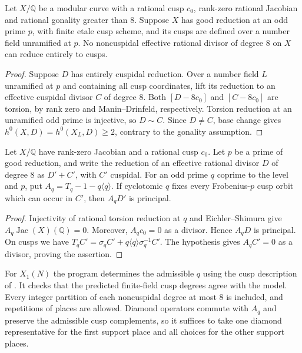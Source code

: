 \begin{lemma}\label{lem:octic-odd-cuspidal}
Let $X/\mathbb Q$ be a modular curve with a rational cusp $c_0$,
rank-zero rational Jacobian and rational gonality greater than $8$.
Suppose $X$ has good reduction at an odd prime $p$, with finite etale
cusp scheme, and its cusps are defined over a number field unramified at $p$.
No noncuspidal effective rational divisor of degree $8$ on $X$ can
reduce entirely to cusps.
\end{lemma}
\begin{proof}
Suppose $D$ has entirely cuspidal reduction. Over a number field $L$
unramified at $p$ and containing all cusp coordinates, lift its reduction
to an effective cuspidal divisor $C$ of degree $8$. Both
$[D-8c_0]$ and $[C-8c_0]$ are torsion, by rank zero and Manin--Drinfeld,
respectively. Torsion reduction at an unramified odd prime is injective,
so $D\sim C$. Since $D\ne C$, base change gives
$h^0(X,D)=h^0(X_L,D)\ge2$, contrary to the gonality assumption.
\end{proof}

\begin{lemma}\label{lem:octic-hecke}
Let $X/\mathbb Q$ have rank-zero Jacobian and a rational cusp $c_0$.
Let $p$ be a prime of good reduction, and write the reduction of an
effective rational divisor $D$ of degree $8$ as $D'+C'$, with $C'$
cuspidal. For an odd prime $q$ coprime to the level and $p$, put
$A_q=T_q-1-q\langle q\rangle$. If cyclotomic $q$ fixes every
Frobenius-$p$ cusp orbit which can occur in $C'$, then $A_qD'$ is principal.
\end{lemma}
\begin{proof}
Injectivity of rational torsion reduction at $q$ and Eichler--Shimura
give $A_q\operatorname{Jac}(X)(\mathbb Q)=0$.
Moreover, $A_qc_0=0$ as a divisor. Hence $A_qD$ is principal.
On cusps we have
$T_qC'=\sigma_q C'+q\langle q\rangle\sigma_q^{-1}C'$.
The hypothesis gives $A_qC'=0$ as a divisor, proving the assertion.
\end{proof}

For $X_1(N)$ the program determines the admissible $q$ using
the cusp description of \cite[Lemma~2.7]{DEHMZ}. It checks that
the predicted finite-field cusp degrees agree with the model.
Every integer partition of each noncuspidal degree at most $8$
is included, and repetitions of places are allowed. Diamond operators
commute with $A_q$ and preserve the admissible cusp complements, so it
suffices to take one diamond representative for the first support place
and all choices for the other support places.
